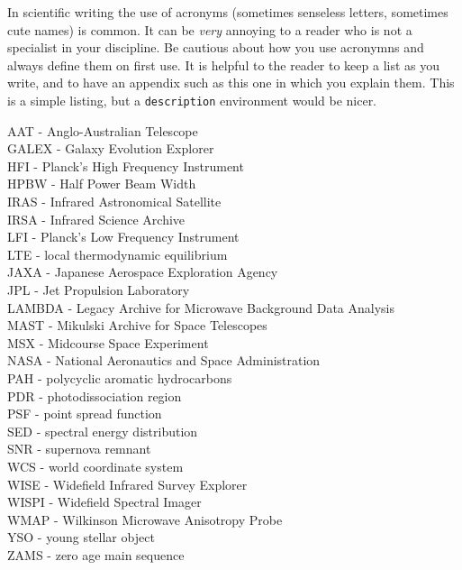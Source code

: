 In scientific writing the use of acronyms (sometimes senseless letters,
sometimes cute names) is common.  It can be \textit{very}\/ annoying to a reader
who is not a specialist in your discipline.  Be cautious about how you use
acronymns and always define them on first use.  It is helpful to the reader to
keep a list as you write, and to have an appendix such as this one in which you
explain them.  This is a simple listing, but a \verb|description| environment
would be nicer. 

\bigskip

\noindent
AAT - Anglo-Australian Telescope \\
GALEX - Galaxy Evolution Explorer \\
HFI - Planck's High Frequency Instrument \\
HPBW - Half Power Beam Width \\
IRAS - Infrared Astronomical Satellite \\
IRSA - Infrared Science Archive \\
LFI - Planck's Low Frequency Instrument \\
LTE - local thermodynamic equilibrium \\
JAXA - Japanese Aerospace Exploration Agency \\
JPL - Jet Propulsion Laboratory \\
LAMBDA - Legacy Archive for Microwave Background Data Analysis \\
MAST - Mikulski Archive for Space Telescopes \\
MSX - Midcourse Space Experiment \\
NASA - National Aeronautics and Space Administration \\
PAH - polycyclic aromatic hydrocarbons \\
PDR - photodissociation region \\
PSF - point spread function \\
SED - spectral energy distribution \\
SNR - supernova remnant \\
WCS - world coordinate system \\
WISE - Widefield Infrared Survey Explorer \\
WISPI - Widefield Spectral Imager \\
WMAP - Wilkinson Microwave Anisotropy Probe \\
YSO - young stellar object \\
ZAMS - zero age main sequence \\










